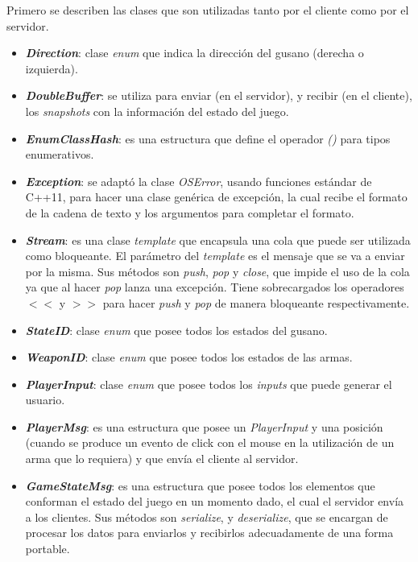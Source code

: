 Primero se describen las clases que son utilizadas tanto por el cliente como por el servidor.

\begin{itemize}
	\item \textbf{\textit{Direction}}: clase \textit{enum} que indica la dirección del gusano (derecha o izquierda).

	\item \textbf{\textit{DoubleBuffer}}: se utiliza para enviar (en el servidor), y recibir (en el cliente), los \textit{snapshots} con la información del estado del juego.

	\item \textbf{\textit{EnumClassHash}}: es una estructura que define el operador \textit{()} para tipos enumerativos.

	\item \textbf{\textit{Exception}}: se adaptó la clase \textit{OSError}, usando funciones estándar de C++11, para hacer una clase genérica de excepción, la cual recibe el formato de la cadena de texto y los argumentos para completar el formato.

	\item \textbf{\textit{Stream}}: es una clase \textit{template} que encapsula una cola que puede ser utilizada como bloqueante. El parámetro del \textit{template} es el mensaje que se va a enviar por la misma. Sus métodos son \textit{push}, \textit{pop} y \textit{close}, que impide el uso de la cola ya que al hacer \textit{pop} lanza una excepción. Tiene sobrecargados los operadores $<<$ y $>>$ para hacer \textit{push} y \textit{pop} de manera bloqueante respectivamente.

	\item \textbf{\textit{StateID}}: clase \textit{enum} que posee todos los estados del gusano.

	\item \textbf{\textit{WeaponID}}: clase \textit{enum} que posee todos los estados de las armas.

	\item \textbf{\textit{PlayerInput}}: clase \textit{enum} que posee todos los \textit{inputs} que puede generar el usuario.

	\item \textbf{\textit{PlayerMsg}}: es una estructura que posee un \textit{PlayerInput} y una posición (cuando se produce un evento de click con el mouse en la utilización de un arma que lo requiera) y que envía el cliente al servidor.

	\item \textbf{\textit{GameStateMsg}}: es una estructura que posee todos los elementos que conforman el estado del juego en un momento dado, el cual el servidor envía a los clientes. Sus métodos son \textit{serialize}, y \textit{deserialize}, que se encargan de procesar los datos para enviarlos y recibirlos adecuadamente de una forma portable.


\end{itemize}
